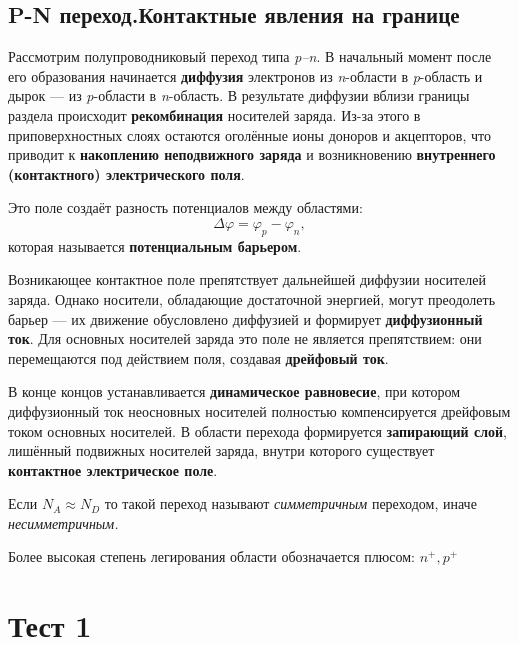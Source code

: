 \documentclass[../main.tex]{subfiles}
\begin{document}
\subsection{P-N переход.Контактные явления на границе}


Рассмотрим полупроводниковый переход типа \textit{p–n}. 
В начальный момент после его образования начинается \textbf{диффузия} электронов из \textit{n}-области в \textit{p}-область и дырок — из \textit{p}-области в \textit{n}-область. 
В результате диффузии вблизи границы раздела происходит \textbf{рекомбинация} носителей заряда. 
Из-за этого в приповерхностных слоях остаются оголённые ионы доноров и акцепторов, что приводит к \textbf{накоплению неподвижного заряда} и возникновению \textbf{внутреннего (контактного) электрического поля}.

Это поле создаёт разность потенциалов между областями:
\[
\Delta \varphi = \varphi_p - \varphi_n,
\]
которая называется \textbf{потенциальным барьером}.

Возникающее контактное поле препятствует дальнейшей диффузии носителей заряда. 
Однако носители, обладающие достаточной энергией, могут преодолеть барьер — их движение обусловлено диффузией и формирует \textbf{диффузионный ток}. 
Для основных носителей заряда это поле не является препятствием: они перемещаются под действием поля, создавая \textbf{дрейфовый ток}.

В конце концов устанавливается \textbf{динамическое равновесие}, при котором диффузионный ток неосновных носителей полностью компенсируется дрейфовым током основных носителей. 
В области перехода формируется \textbf{запирающий слой}, лишённый подвижных носителей заряда, внутри которого существует \textbf{контактное электрическое поле}.


 Если $N_A \approx N_D$ то такой переход называют \textit{симметричным} переходом, иначе \textit{несимметричным.} 

Более высокая степень легирования области обозначается плюсом: $n^{+}, p^{+}$


\section{Тест 1}
\end{document}
